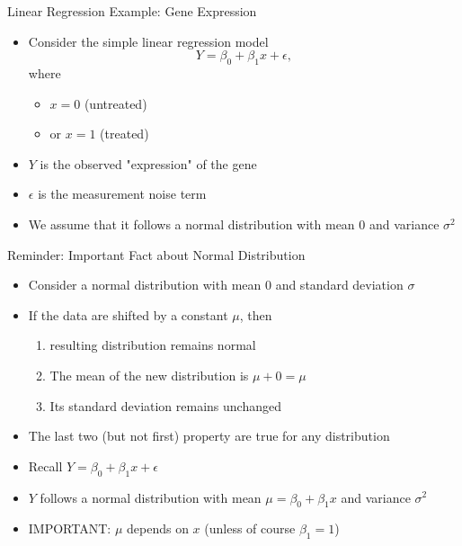 \documentclass[xcolor=x11names,compress]{beamer}\usepackage[]{graphicx}\usepackage[]{color}
\begin{document}
\begin{frame}{Linear Regression Example: Gene Expression}
  \begin{itemize}
  \item Consider the simple linear regression model
    \begin{equation*}
      Y=\beta_0+\beta_1 x + \epsilon,
    \end{equation*}
  where 
  \begin{itemize}
  \item   $x=0$ (untreated)
    \item or $x=1$ (treated)
  \end{itemize}
\item $Y$ is the observed "expression" of the gene
 \item $\epsilon$ is the measurement noise term
 \item We assume that it follows a normal distribution  with mean 0
       and variance $\sigma^2$
       \end{itemize}
\end{frame}

\begin{frame}{Reminder: Important Fact about Normal Distribution}
  \begin{itemize}
  \item Consider a normal distribution with mean 0 and standard deviation
        $\sigma$
  \item If the data are shifted by a constant $\mu$, then
    \begin{enumerate}
    \item  resulting
        distribution remains normal
     \item The mean of the new distribution is $\mu+0=\mu$
  \item Its standard deviation remains unchanged
    \end{enumerate}
  \item The last two (but not first) property are true for any distribution
  \item Recall $Y=\beta_0+\beta_1 x + \epsilon$
  \item $Y$ follows a normal distribution with mean $\mu=\beta_0+\beta_1 x$ and variance $\sigma^2$
  \item IMPORTANT: $\mu$ depends on $x$ (unless of course $\beta_1=1$)
  \end{itemize}
\end{frame}
\end{document}
